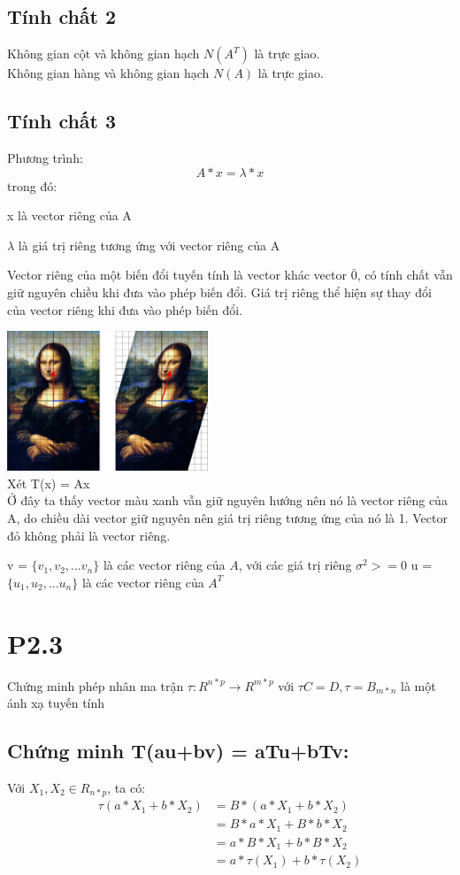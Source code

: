 \documentclass[a4paper,11pt]{article}
\theoremstyle{mytheor}
\begin{document}
\subsection*{Tính chất 2}
Không gian cột và không gian hạch $N(A^T)$ là trực giao.\\
Không gian hàng và không gian hạch $N(A)$ là trực giao. 

\subsection*{Tính chất 3}
Phương trình:
    $$A*x = \lambda*x$$
trong đó:

x là vector riêng của A

$\lambda$ là giá trị riêng tương ứng với vector riêng của A

Vector riêng của một biến đổi tuyến tính là vector khác vector $\bar{0}$, có tính chất vẫn giữ nguyên chiều khi đưa vào phép biến đổi. Giá trị riêng thể hiện sự thay đổi của vector riêng khi đưa vào phép biến đổi.\\

\begin{multicols}{2}
\includegraphics[width=0.45\textwidth]{P2_2_01.png}
\columnbreak
\\
Xét T(x) = Ax\\
Ở đây ta thấy vector màu xanh vẫn giữ nguyên hướng nên nó là vector riêng của A, do chiều dài vector giữ nguyên nên giá trị riêng tương ứng của nó là 1. Vector đỏ không phải là vector riêng.
\end{multicols}

v = $\{v_1,v_2,...v_n\}$ là các vector riêng của $A$, với các giá trị riêng $\sigma^2>=0$
u = $\{u_1,u_2,...u_n\}$ là các vector riêng của $A^T$

\section*{P2.3}
Chứng minh phép nhân ma trận $\tau: R^{n*p} \xrightarrow{} R^{m*p}$ với $\tau C=D, \tau = B_{m*n}$ là một ánh xạ tuyến tính
\subsection*{Chứng minh T(au+bv) = aTu+bTv:}
Với $X_1,X_2 \in R_{n*p}$, ta có:
\begin{align}
    \nonumber\tau(a*X_1+b*X_2) &= B*(a*X_1+b*X_2)\\
    \nonumber&= B*a*X_1 + B*b*X_2\\
    \nonumber&= a*B*X_1 + b*B*X_2\\
    \nonumber&= a*\tau(X_1) + b*\tau(X_2)
\end{align}
\end{document}
